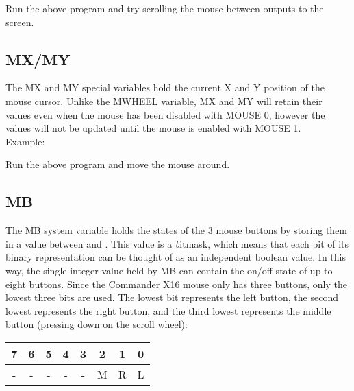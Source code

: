 Run the above program and try scrolling the mouse between outputs to the
screen.\\

\subsection{MX/MY}

The {\ttfamily MX} and {\ttfamily MY} special variables hold the current X and
Y position of the mouse cursor.  Unlike the {\ttfamily MWHEEL} variable,
{\ttfamily MX} and {\ttfamily MY} will retain their values even when the mouse
has been disabled with {\ttfamily MOUSE 0}, however the values will not be
updated until the mouse is enabled with {\ttfamily MOUSE 1}.\\

Example:\\


Run the above program and move the mouse around.\\

\subsection{MB}

The {\ttfamily MB} system variable holds the states of the 3 mouse buttons by
storing them in a value between {} and {}.  This value is
a {\emph bitmask}, which means that each bit of its binary representation can
be thought of as an independent boolean value.  In this way, the single integer
value held by {\ttfamily MB} can contain the on/off state of up to eight
buttons.  Since the Commander X16 mouse only has three buttons, only the lowest
three bits are used.  The lowest bit represents the left button, the second
lowest represents the right button, and the third lowest represents the middle
button (pressing down on the scroll wheel):\\

\begin{tabular}{|c|c|c|c|c|c|c|c|}
	\hline

	{\bfseries 7} &{\bfseries 6} &{\bfseries 5} &{\bfseries 4} &{\bfseries 3}
	&{\bfseries 2} &{\bfseries 1} &{\bfseries 0}\\ \hline

	- & - & - & - & - & M & R & L \\ \hline
	
\end{tabular}

